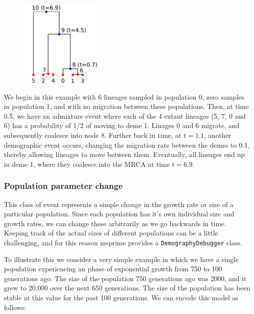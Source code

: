 \documentclass[graybox]{svmult}
\newcommand{\includenbimage}[1]{\begin{center}\texttt{[image: \#1]}\end{center}}
\begin{document}
\begin{figure}
  \begin{center}
    \includegraphics[width=0.38\textwidth]{images/simulations_39_0.pdf}
  \end{center}
\end{figure}

    We begin in this example with 6 lineages sampled in population 0, zero
samples in population 1, and with no migration between these
populations. Then, at time 0.5, we have an admixture event where each of
the 4 extant lineages (5, 7, 0 and 6) has a probability of 1/2 of moving
to deme 1. Linages 0 and 6 migrate, and subsequently coalesce into node
8. Further back in time, at \(t=1.1\), another demographic event occurs,
changing the migration rate between the demes to 0.1, thereby allowing
lineages to move between them. Eventually, all lineages end up in deme
1, where they coalesce into the MRCA at time \(t=6.9\).

\subsubsection{Population parameter change}\label{population-parameter-change}

This class of event represents a simple change in the growth rate or
size of a particular population. Since each population has it's own
individual size and growth rates, we can change these arbitrarily as we
go backwards in time. Keeping track of the actual sizes of different
populations can be a little challenging, and for this reason msprime
provides a \texttt{DemographyDebugger} class.

To illustrate this we consider a very simple example in which we have a
single population experiencing an phase of exponential growth from 750
to 100 generations ago. The size of the population 750 generations ago
was 2000, and it grew to 20,000 over the next 650 generations. The size
of the population has been stable at this value for the past 100
generations. We can encode this model as follows:
\end{document}
